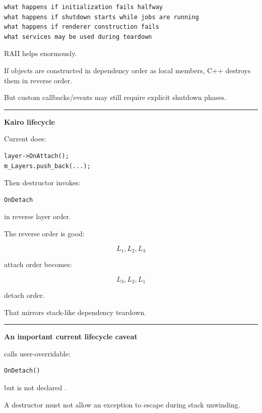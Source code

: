 \begin{verbatim}
what happens if initialization fails halfway
what happens if shutdown starts while jobs are running
what happens if renderer construction fails
what services may be used during teardown
\end{verbatim}

RAII helps enormously.

If objects are constructed in dependency order as local members, C++ destroys them in reverse order.

But custom callbacks/events may still require explicit shutdown phases.

\begin{center}\rule{0.5\linewidth}{0.5pt}\end{center}

\textbf{Kairo  lifecycle}

Current  does:

\begin{verbatim}
layer->OnAttach();
m_Layers.push_back(...);
\end{verbatim}

Then destructor invokes:

\begin{verbatim}
OnDetach
\end{verbatim}

in reverse layer order.

The reverse order is good:

\[
L_1,L_2,L_3
\]

attach order becomes:

\[
L_3,L_2,L_1
\]

detach order.

That mirrors stack-like dependency teardown.

\begin{center}\rule{0.5\linewidth}{0.5pt}\end{center}

\textbf{An important current lifecycle caveat}

 calls user-overridable:

\begin{verbatim}
OnDetach()
\end{verbatim}

but  is not declared .

A destructor must not allow an exception to escape during stack unwinding.

